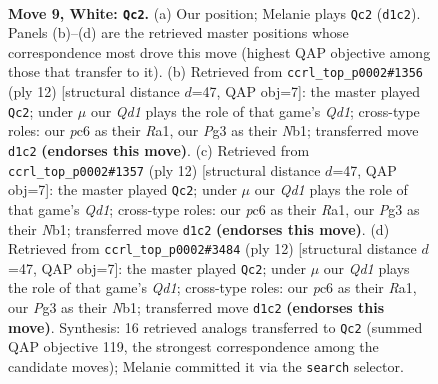 \documentclass[11pt]{article}
\begin{document}
\clearpage

\begin{figure}[p]\centering
\begin{subfigure}{0.46\textwidth}\centering
\resizebox{\linewidth}{!}{%
\newchessgame
\chessboard[
  setfen={rnbq1rk1/pp4pp/2pb1n2/3p1pB1/3P4/5NP1/PP2PPBP/RN1Q1RK1 w - - 2 9},
  showmover=false,
  pgfstyle=straightmove, color=movearrow, markmove={d1-c2}
]}
\caption{}
\end{subfigure}\hfill
\begin{subfigure}{0.46\textwidth}\centering
\resizebox{\linewidth}{!}{%
\newchessgame
\chessboard[
  setfen={rnbq1rk1/ppp1bppp/4pn2/8/2pP4/5NP1/PP2PPBP/RNBQ1RK1 w - - 0 7},
  showmover=false,
  pgfstyle=straightmove, color=movearrow, markmove={d1-c2}
]}
\caption{}
\end{subfigure}
\\[4pt]
\begin{subfigure}{0.46\textwidth}\centering
\resizebox{\linewidth}{!}{%
\newchessgame
\chessboard[
  setfen={rnbq1rk1/ppp1bppp/4pn2/8/2pP4/5NP1/PP2PPBP/RNBQ1RK1 w - - 0 7},
  showmover=false,
  pgfstyle=straightmove, color=movearrow, markmove={d1-c2}
]}
\caption{}
\end{subfigure}\hfill
\begin{subfigure}{0.46\textwidth}\centering
\resizebox{\linewidth}{!}{%
\newchessgame
\chessboard[
  setfen={rnbq1rk1/ppp1bppp/4pn2/8/2pP4/5NP1/PP2PPBP/RNBQ1RK1 w - - 0 7},
  showmover=false,
  pgfstyle=straightmove, color=movearrow, markmove={d1-c2}
]}
\caption{}
\end{subfigure}
\caption{\textbf{Move 9, White: \texttt{Qc2}.} (a) Our position; Melanie plays \texttt{Qc2} (\texttt{d1c2}). Panels (b)--(d) are the retrieved master positions whose correspondence most drove this move (highest QAP objective among those that transfer to it). (b) Retrieved from \texttt{ccrl\_top\_p0002\#1356} (ply 12) [structural distance $d$=47, QAP obj=7]: the master played \texttt{Qc2}; under $\mu$ our \emph{Qd1} plays the role of that game's \emph{Qd1}; cross-type roles: our \emph{p}c6 as their \emph{R}a1, our \emph{P}g3 as their \emph{N}b1; transferred move \texttt{d1c2} \textbf{(endorses this move)}. (c) Retrieved from \texttt{ccrl\_top\_p0002\#1357} (ply 12) [structural distance $d$=47, QAP obj=7]: the master played \texttt{Qc2}; under $\mu$ our \emph{Qd1} plays the role of that game's \emph{Qd1}; cross-type roles: our \emph{p}c6 as their \emph{R}a1, our \emph{P}g3 as their \emph{N}b1; transferred move \texttt{d1c2} \textbf{(endorses this move)}. (d) Retrieved from \texttt{ccrl\_top\_p0002\#3484} (ply 12) [structural distance $d$=47, QAP obj=7]: the master played \texttt{Qc2}; under $\mu$ our \emph{Qd1} plays the role of that game's \emph{Qd1}; cross-type roles: our \emph{p}c6 as their \emph{R}a1, our \emph{P}g3 as their \emph{N}b1; transferred move \texttt{d1c2} \textbf{(endorses this move)}. Synthesis: 16 retrieved analogs transferred to \texttt{Qc2} (summed QAP objective 119, the strongest correspondence among the candidate moves); Melanie committed it via the \texttt{search} selector.}
\label{fig:thought-m16}
\end{figure}
\end{document}

